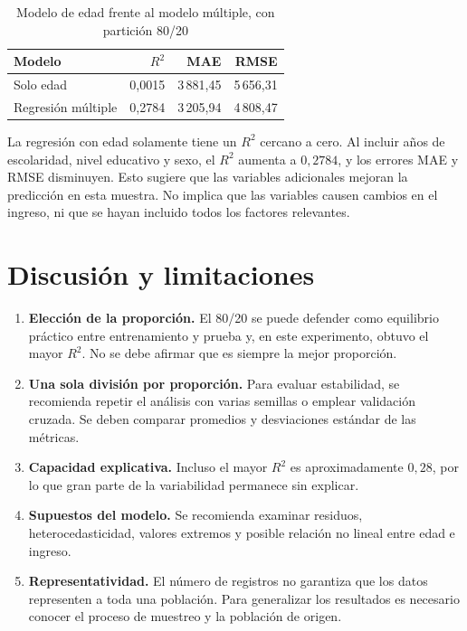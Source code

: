 \documentclass[12pt,a4paper]{article}
\begin{document}
\begin{table}[H]
\centering
\caption{Modelo de edad frente al modelo múltiple, con partición 80/20}
\begin{tabular}{lrrr}
\toprule
\textbf{Modelo} & \textbf{$R^2$} & \textbf{MAE} & \textbf{RMSE}\\
\midrule
Solo edad & 0,0015 & 3\,881,45 & 5\,656,31\\
Regresión múltiple & 0,2784 & 3\,205,94 & 4\,808,47\\
\bottomrule
\end{tabular}
\end{table}

La regresión con edad solamente tiene un $R^2$ cercano a cero. Al incluir años de escolaridad, nivel educativo y sexo, el $R^2$ aumenta a $0{,}2784$, y los errores MAE y RMSE disminuyen. Esto sugiere que las variables adicionales mejoran la predicción en esta muestra. No implica que las variables causen cambios en el ingreso, ni que se hayan incluido todos los factores relevantes.

\section{Discusión y limitaciones}
\begin{enumerate}[label=\arabic*)]
\item \textbf{Elección de la proporción.} El 80/20 se puede defender como equilibrio práctico entre entrenamiento y prueba y, en este experimento, obtuvo el mayor $R^2$. No se debe afirmar que es siempre la mejor proporción.
\item \textbf{Una sola división por proporción.} Para evaluar estabilidad, se recomienda repetir el análisis con varias semillas o emplear validación cruzada. Se deben comparar promedios y desviaciones estándar de las métricas.
\item \textbf{Capacidad explicativa.} Incluso el mayor $R^2$ es aproximadamente $0{,}28$, por lo que gran parte de la variabilidad permanece sin explicar.
\item \textbf{Supuestos del modelo.} Se recomienda examinar residuos, heterocedasticidad, valores extremos y posible relación no lineal entre edad e ingreso.
\item \textbf{Representatividad.} El número de registros no garantiza que los datos representen a toda una población. Para generalizar los resultados es necesario conocer el proceso de muestreo y la población de origen.
\end{enumerate}
\end{document}
